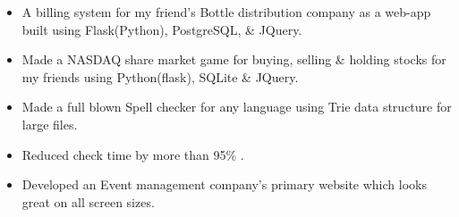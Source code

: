 











\begin{itemize}
\item A  billing  system  for  my  friend's  Bottle  distribution  company as a web-app built using Flask(Python), PostgreSQL, \& JQuery.

\end{itemize}
\smallskip
{}
\begin{itemize}
\item Made a NASDAQ share market game for buying, selling \& holding stocks for my friends using Python(flask), SQLite \& JQuery. 

\end{itemize}
\smallskip
{}
\begin{itemize}
\item Made a full blown Spell checker for any language using Trie data structure for large files. 
\item Reduced check time by more than 95\% .
\end{itemize}
\smallskip
{}
\begin{itemize}
\item Developed an Event management company's primary website which looks great on all screen sizes.
\end{itemize}
\smallskip

